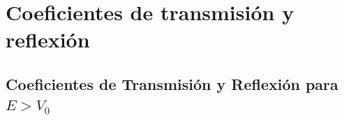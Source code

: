 \chapter{Coeficientes de transmisión y reflexión}\label{aped.A}


\section{Coeficientes de Transmisión y Reflexión para $E>V_0$}

